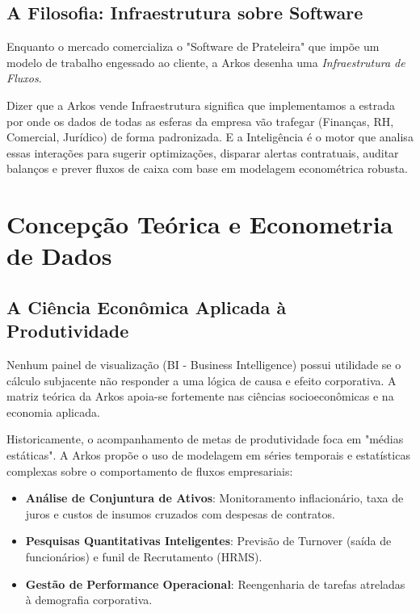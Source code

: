 \documentclass[12pt,a4paper,oneside]{report}
\begin{document}
\section{A Filosofia: Infraestrutura sobre Software}
Enquanto o mercado comercializa o "Software de Prateleira" que impõe um modelo de trabalho engessado ao cliente, a Arkos desenha uma \textit{Infraestrutura de Fluxos}. 

Dizer que a Arkos vende Infraestrutura significa que implementamos a estrada por onde os dados de todas as esferas da empresa vão trafegar (Finanças, RH, Comercial, Jurídico) de forma padronizada. E a Inteligência é o motor que analisa essas interações para sugerir optimizações, disparar alertas contratuais, auditar balanços e prever fluxos de caixa com base em modelagem econométrica robusta.

\pagebreak

\chapter{Concepção Teórica e Econometria de Dados}

\section{A Ciência Econômica Aplicada à Produtividade}
Nenhum painel de visualização (BI - Business Intelligence) possui utilidade se o cálculo subjacente não responder a uma lógica de causa e efeito corporativa. A matriz teórica da Arkos apoia-se fortemente nas ciências socioeconômicas e na economia aplicada.

Historicamente, o acompanhamento de metas de produtividade foca em "médias estáticas". A Arkos propõe o uso de modelagem em séries temporais e estatísticas complexas sobre o comportamento de fluxos empresariais:
\begin{itemize}
  \item \textbf{Análise de Conjuntura de Ativos}: Monitoramento inflacionário, taxa de juros e custos de insumos cruzados com despesas de contratos.
  \item \textbf{Pesquisas Quantitativas Inteligentes}: Previsão de Turnover (saída de funcionários) e funil de Recrutamento (HRMS).
  \item \textbf{Gestão de Performance Operacional}: Reengenharia de tarefas atreladas à demografia corporativa.
\end{itemize}
\end{document}
